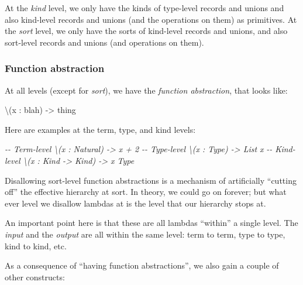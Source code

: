\documentclass[]{article}
\newenvironment{Shaded}{}{}
\newcommand{\CommentTok}[1]{\textcolor[rgb]{0.38,0.63,0.69}{\textit{#1}}}
\newcommand{\NormalTok}[1]{#1}
\newcommand{\OperatorTok}[1]{\textcolor[rgb]{0.40,0.40,0.40}{#1}}
\begin{document}
At the \emph{kind} level, we only have the kinds of type-level records and
unions and also kind-level records and unions (and the operations on them) as
primitives. At the \emph{sort} level, we only have the sorts of kind-level
records and unions, and also sort-level records and unions (and operations on
them).

\subsubsection{Function abstraction}\label{function-abstraction}

At all levels (except for \emph{sort}), we have the \emph{function abstraction},
that looks like:

\begin{Shaded}
\begin{Highlighting}[]
\OperatorTok{\textbackslash{}}\NormalTok{(x}\CommentTok{ }\NormalTok{:}\CommentTok{ }\NormalTok{blah)}\CommentTok{ }\OperatorTok{{-}\textgreater{}}\CommentTok{ }\NormalTok{thing}
\end{Highlighting}
\end{Shaded}

Here are examples at the term, type, and kind levels:

\begin{Shaded}
\begin{Highlighting}[]
\CommentTok{{-}{-} Term{-}level}
\CommentTok{\textbackslash{}(x : Natural) {-}\textgreater{} x + 2}
\CommentTok{{-}{-} Type{-}level}
\CommentTok{\textbackslash{}(x : Type) {-}\textgreater{} List x}
\CommentTok{{-}{-} Kind{-}level}
\CommentTok{\textbackslash{}(x : Kind {-}\textgreater{} Kind) {-}\textgreater{} x Type}
\end{Highlighting}
\end{Shaded}

Disallowing sort-level function abstractions is a mechanism of artificially
``cutting off'' the effective hierarchy at sort. In theory, we could go on
forever; but what ever level we disallow lambdas at is the level that our
hierarchy stops at.

An important point here is that these are all lambdas ``within'' a single level.
The \emph{input} and the \emph{output} are all within the same level: term to
term, type to type, kind to kind, etc.

As a consequence of ``having function abstractions'', we also gain a couple of
other constructs:
\end{document}
